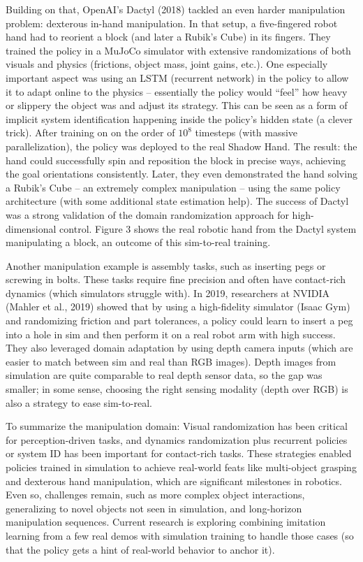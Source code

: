 Building on that, OpenAI’s Dactyl (2018) tackled an even harder manipulation problem: dexterous in-hand manipulation. In that setup, a five-fingered robot hand had to reorient a block (and later a Rubik’s Cube) in its fingers. They trained the policy in a MuJoCo simulator with extensive randomizations of both visuals and physics (frictions, object mass, joint gains, etc.). One especially important aspect was using an LSTM (recurrent network) in the policy to allow it to adapt online to the physics – essentially the policy would “feel” how heavy or slippery the object was and adjust its strategy. This can be seen as a form of implicit system identification happening inside the policy’s hidden state (a clever trick). After training on on the order of $10^8$ timesteps (with massive parallelization), the policy was deployed to the real Shadow Hand. The result: the hand could successfully spin and reposition the block in precise ways, achieving the goal orientations consistently. Later, they even demonstrated the hand solving a Rubik’s Cube – an extremely complex manipulation – using the same policy architecture (with some additional state estimation help). The success of Dactyl was a strong validation of the domain randomization approach for high-dimensional control. Figure 3 shows the real robotic hand from the Dactyl system manipulating a block, an outcome of this sim-to-real training.

Another manipulation example is assembly tasks, such as inserting pegs or screwing in bolts. These tasks require fine precision and often have contact-rich dynamics (which simulators struggle with). In 2019, researchers at NVIDIA (Mahler et al., 2019) showed that by using a high-fidelity simulator (Isaac Gym) and randomizing friction and part tolerances, a policy could learn to insert a peg into a hole in sim and then perform it on a real robot arm with high success. They also leveraged domain adaptation by using depth camera inputs (which are easier to match between sim and real than RGB images). Depth images from simulation are quite comparable to real depth sensor data, so the gap was smaller; in some sense, choosing the right sensing modality (depth over RGB) is also a strategy to ease sim-to-real.

To summarize the manipulation domain: Visual randomization has been critical for perception-driven tasks, and dynamics randomization plus recurrent policies or system ID has been important for contact-rich tasks. These strategies enabled policies trained in simulation to achieve real-world feats like multi-object grasping and dexterous hand manipulation, which are significant milestones in robotics. Even so, challenges remain, such as more complex object interactions, generalizing to novel objects not seen in simulation, and long-horizon manipulation sequences. Current research is exploring combining imitation learning from a few real demos with simulation training to handle those cases (so that the policy gets a hint of real-world behavior to anchor it).

